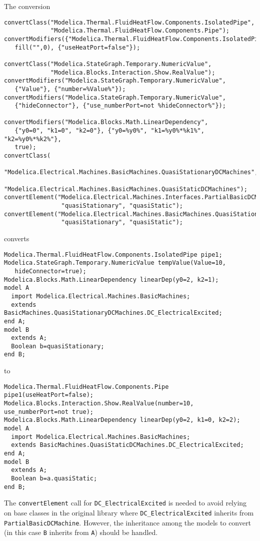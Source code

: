 \begin{example}
The conversion
\begin{lstlisting}[language=modelica]
convertClass("Modelica.Thermal.FluidHeatFlow.Components.IsolatedPipe",
             "Modelica.Thermal.FluidHeatFlow.Components.Pipe");
convertModifiers({"Modelica.Thermal.FluidHeatFlow.Components.IsolatedPipe"},
   fill("",0), {"useHeatPort=false"});

convertClass("Modelica.StateGraph.Temporary.NumericValue",
             "Modelica.Blocks.Interaction.Show.RealValue");
convertModifiers("Modelica.StateGraph.Temporary.NumericValue",
   {"Value"}, {"number=%Value%"});
convertModifiers("Modelica.StateGraph.Temporary.NumericValue",
   {"hideConnector"}, {"use_numberPort=not %hideConnector%"});

convertModifiers("Modelica.Blocks.Math.LinearDependency",
   {"y0=0", "k1=0", "k2=0"}, {"y0=%y0%", "k1=%y0%*%k1%", "k2=%y0%*%k2%"},
   true);
convertClass(
   "Modelica.Electrical.Machines.BasicMachines.QuasiStationaryDCMachines",
   "Modelica.Electrical.Machines.BasicMachines.QuasiStaticDCMachines");
convertElement("Modelica.Electrical.Machines.Interfaces.PartialBasicDCMachine",
                "quasiStationary", "quasiStatic");
convertElement("Modelica.Electrical.Machines.BasicMachines.QuasiStationaryDCMachines.DC_ElectricalExcited",
                "quasiStationary", "quasiStatic");
\end{lstlisting}
converts
\begin{lstlisting}[language=modelica]
Modelica.Thermal.FluidHeatFlow.Components.IsolatedPipe pipe1;
Modelica.StateGraph.Temporary.NumericValue tempValue(Value=10,
   hideConnector=true);
Modelica.Blocks.Math.LinearDependency linearDep(y0=2, k2=1);
model A
  import Modelica.Electrical.Machines.BasicMachines;
  extends BasicMachines.QuasiStationaryDCMachines.DC_ElectricalExcited;
end A;
model B
  extends A;
  Boolean b=quasiStationary;
end B;
\end{lstlisting}
to
\begin{lstlisting}[language=modelica]
Modelica.Thermal.FluidHeatFlow.Components.Pipe pipe1(useHeatPort=false);
Modelica.Blocks.Interaction.Show.RealValue(number=10, use_numberPort=not true);
Modelica.Blocks.Math.LinearDependency linearDep(y0=2, k1=0, k2=2);
model A
  import Modelica.Electrical.Machines.BasicMachines;
  extends BasicMachines.QuasiStaticDCMachines.DC_ElectricalExcited;
end A;
model B
  extends A;
  Boolean b=a.quasiStatic;
end B;
\end{lstlisting}
The \lstinline!convertElement! call for \lstinline!DC_ElectricalExcited! is needed to avoid relying on base classes in the original library where \lstinline!DC_ElectricalExcited! inherits from \lstinline!PartialBasicDCMachine!.
However, the inheritance among the models to convert (in this case \lstinline!B! inherits from \lstinline!A!) should be handled.
\end{example}

